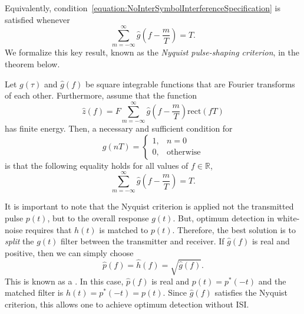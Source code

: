Equivalently, condition~\eqref{equation:NoInterSymbolInterferenceSpecification} is satisfied whenever
\begin{equation} \label{equation:NyquistNoISI}
\sum_{m = -\infty}^{\infty} \hat{g} \left( f - \frac{m}{T} \right) = T .
\end{equation}
We formalize this key result, known as the \emph{Nyquist pulse-shaping criterion}, in the theorem below.

\begin{theorem}[Nyquist] \label{theorem:NyquistPulseCriterion}
Let $g(\tau)$ and $\hat{g}(f)$ be square integrable functions that are Fourier transforms of each other.
Furthermore, assume that the function
\begin{equation*}
\hat{z} (f) = F \sum_{m=-\infty}^{\infty} \hat{g} \left( f - \frac{m}{T} \right)
\mathrm{rect} (fT)
\end{equation*}
has finite energy.
Then, a necessary and sufficient condition for
\begin{equation*}
g(nT) = \begin{cases} 1, & n = 0 \\
0, & \text{otherwise} \end{cases}
\end{equation*}
is that the following equality holds for all values of $f \in \mathbb{R}$,
\begin{equation} \label{equation:NyquistCriterionFrequencyCondition}
\sum_{m=-\infty}^{\infty} \hat{g} \left( f - \frac{m}{T} \right) = T .
\end{equation}
\end{theorem}

It is important to note that the Nyquist criterion is applied not the transmitted pulse $p(t)$, but to the overall response $g(t)$.
But, optimum detection in white-noise requires that $h (t)$ is matched to $p(t)$.
Therefore, the best solution is to \emph{split} the $g(t)$ filter between the transmitter and receiver.
If $\hat{g}(f)$ is real and positive, then we can simply choose
\[ \hat{p}(f) = \hat{h} (f) = \sqrt{\hat{g}(f)}. \]
This is known as a .
In this case, $\hat{p}(f)$ is real and $p(t) = p^* (-t)$ and the matched filter is $h(t) = p^*(-t) = p(t)$.
Since $\hat{g}(f)$ satisfies the Nyquist criterion, this allows one to achieve optimum detection without ISI.

